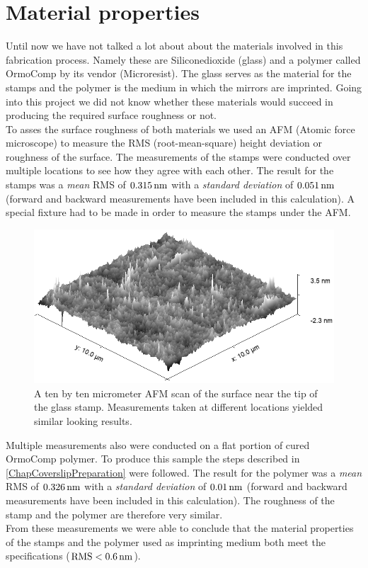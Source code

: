 \section{Material properties}\label{ChapMatProp}
Until now we have not talked a lot about about the materials involved in this fabrication process. Namely these are Siliconedioxide (glass) and a polymer called OrmoComp by its vendor (Microresist). The glass serves as the material for the stamps and the polymer is the medium in which the mirrors are imprinted. Going into this project we did not know whether these materials would succeed in producing the required surface roughness or not.\\
To asses the surface roughness of both materials we used an AFM (Atomic force microscope) to measure the RMS (root-mean-square) height deviation or roughness of the surface. The measurements of the stamps were conducted over multiple locations to see how they agree with each other. The result for the stamps was a \textit{mean} RMS of $0.315\nm$ with a \textit{standard deviation} of $0.051\nm$ (forward and backward measurements have been included in this calculation). A special fixture had to be made in order to measure the stamps under the AFM.\\
\begin{figure}[H]
	\includegraphics[scale=0.5]{source/stamp_rms}
	\caption{A ten by ten micrometer AFM scan of the surface near the tip of the glass stamp. Measurements taken at different locations yielded similar looking results.}
\end{figure}
Multiple measurements also were conducted on a flat portion of cured OrmoComp polymer. To produce this sample the steps described in \autoref{ChapCoverslipPreparation} were followed. The result for the polymer was a \textit{mean} RMS of $0.326\nm$ with a \textit{standard deviation} of $0.01\nm$ (forward and backward measurements have been included in this calculation). The roughness of the stamp and the polymer are therefore very similar.\\
From these measurements we were able to conclude that the material properties of the stamps and the polymer used as imprinting medium both meet the specifications ($\si{RMS}<0.6\nm$). 

